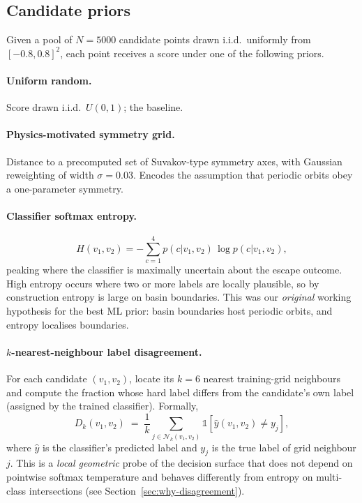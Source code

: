 \documentclass[11pt]{article}
\begin{document}
\subsection{Candidate priors}

Given a pool of $N = 5000$ candidate points drawn i.i.d.\ uniformly
from $[-0.8, 0.8]^2$, each point receives a score under one of the
following priors.

\paragraph{Uniform random.} Score drawn i.i.d.\ $U(0,1)$; the
baseline.

\paragraph{Physics-motivated symmetry grid.} Distance to a
precomputed set of Suvakov-type symmetry axes, with Gaussian
reweighting of width $\sigma = 0.03$. Encodes the assumption that
periodic orbits obey a one-parameter symmetry.

\paragraph{Classifier softmax entropy.}
\begin{equation}
  H(v_1, v_2) = -\sum_{c=1}^{4} p(c|v_1, v_2)\,\log p(c|v_1, v_2),
  \label{eq:entropy}
\end{equation}
peaking where the classifier is maximally uncertain about the escape
outcome. High entropy occurs where two or more labels are locally
plausible, so by construction entropy is large on basin boundaries.
This was our \emph{original} working hypothesis for the best ML prior:
basin boundaries host periodic orbits, and entropy localises
boundaries.

\paragraph{$k$-nearest-neighbour label disagreement.} For each
candidate $(v_1, v_2)$, locate its $k=6$ nearest training-grid
neighbours and compute the fraction whose hard label differs from the
candidate's own label (assigned by the trained classifier). Formally,
\begin{equation}
  D_k(v_1, v_2)
  \;=\;
  \frac{1}{k}\sum_{j\in \mathcal{N}_k(v_1, v_2)}
    \mathbb{1}\!\left[\hat{y}(v_1, v_2) \ne y_j\right],
  \label{eq:disagreement}
\end{equation}
where $\hat{y}$ is the classifier's predicted label and $y_j$ is the
true label of grid neighbour $j$. This is a \emph{local geometric}
probe of the decision surface that does not depend on pointwise
softmax temperature and behaves differently from entropy on
multi-class intersections (see Section~\ref{sec:why-disagreement}).
\end{document}

